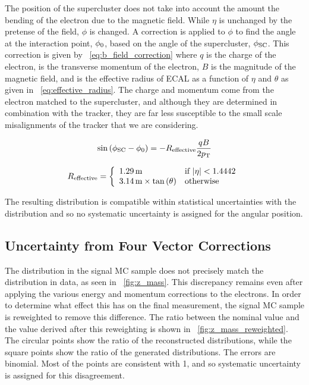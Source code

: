 The position of the supercluster does not take into account the amount the
bending of the electron due to the magnetic field. While $\eta$ is unchanged by
the pretense of the field, $\phi$ is changed. A correction is applied to $\phi$
to find the angle at the interaction point, $\phi_{0}$, based on the angle of
the supercluster, $\phi_{\text{SC}}$. This correction is given by
\EQ~\ref{eq:b_field_correction} where $q$ is the charge of the electron, \pt is
the transverse momentum of the electron, $B$ is the magnitude of the magnetic
field, and \Reffective is the effective radius of ECAL as a function of $\eta$
and $\theta$ as given in \EQ~\ref{eq:effective_radius}. The charge and momentum
come from the electron matched to the supercluster, and although they are
determined in combination with the tracker, they are far less susceptible to
the small scale misalignments of the tracker that we are considering.

\begin{equation}\label{eq:b_field_correction}
    \sin \left( \phi_{\text{SC}} - \phi_{0} \right)
    =
    - R_{\text{effective}} \frac{q B}{2 p_{\mathrm{T}}}
\end{equation}

\begin{equation}\label{eq:effective_radius}
    R_{\text{effective}}
    =
    \left\{
        \begin{array}{ll}
            1.29 \text{\,m} & \text{if } |\eta| < 1.4442 \\
            3.14 \text{\,m} \times \tan \left(\theta\right) & \text{otherwise}
        \end{array}
    \right.
\end{equation}

The resulting \phistarSC distribution is compatible within statistical
uncertainties with the \phistar distribution and so no systematic uncertainty
is assigned for the angular position.


\subsection{Uncertainty from Four Vector Corrections}

The \mee distribution in the \MADGRAPH signal MC sample does not precisely
match the distribution in data, as seen in \FIG~\ref{fig:z_mass}. This
discrepancy remains even after applying the various energy and momentum
corrections to the electrons. In order to determine what effect this has on the
final measurement, the \MADGRAPH signal MC sample is reweighted to remove this
difference. The ratio between the nominal \phistar value and the value derived
after this reweighting is shown in \FIG~\ref{fig:z_mass_reweighted}. The
circular points show the ratio of the reconstructed \phistar distributions,
while the square points show the ratio of the generated \phistar distributions.
The errors are binomial. Most of the points are consistent with \num{1}, and so
systematic uncertainty is assigned for this disagreement.

